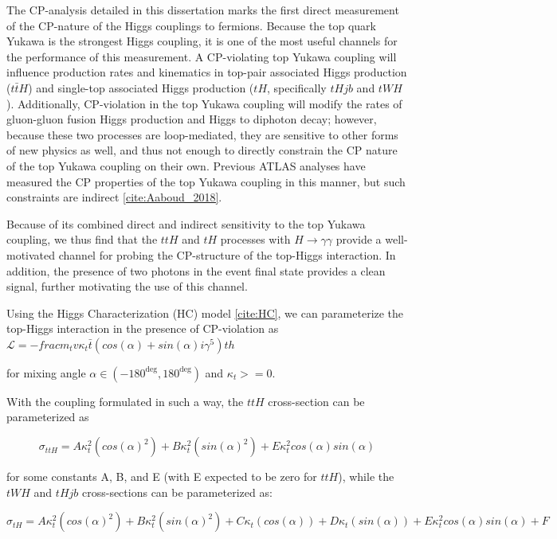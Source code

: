 The CP-analysis detailed in this dissertation marks the first direct measurement of the CP-nature of the Higgs couplings to fermions. Because the top quark Yukawa is the strongest Higgs coupling, it is one of the most useful channels for the performance of this measurement. A CP-violating top Yukawa coupling will influence production rates and kinematics in top-pair associated Higgs production ($t \bar{t} H$) and single-top associated Higgs production ($tH$, specifically $tHjb$ and $tWH$). Additionally, CP-violation in the top Yukawa coupling will modify the rates of gluon-gluon fusion Higgs production and Higgs to diphoton decay; however, because these two processes are loop-mediated, they are sensitive to other forms of new physics as well, and thus not enough to directly constrain the CP nature of the top Yukawa coupling on their own. Previous ATLAS analyses have measured the CP properties of the top Yukawa coupling in this manner, but such constraints are indirect \ref{cite:Aaboud_2018}.

Because of its combined direct and indirect sensitivity to the top Yukawa coupling, we thus find that the $ttH$ and $tH$ processes with $H \rightarrow \gamma \gamma $ provide a well-motivated channel for probing the CP-structure of the top-Higgs interaction. In addition, the presence of two photons in the event final state provides a clean signal, further motivating the use of this channel. 

Using the Higgs Characterization (HC) model \ref{cite:HC}, we can parameterize the top-Higgs interaction in the presence of CP-violation as $\mathcal{L} = -frac{m_{t}}{v} \kappa_{t} \bar{t} (cos(\alpha)+ sin(\alpha) i \gamma^{5} )th$

for mixing angle $\alpha \in (-180^{\deg}, 180^{\deg})$ and $\kappa_{t} >= 0$.

With the coupling formulated in such a way, the $ttH$ cross-section can be parameterized as

\begin{equation}
\sigma_{ttH} =  A\kappa_{t}^{2} (cos(\alpha)^{2}) + B\kappa_{t}^{2} (sin(\alpha)^{2}) + E \kappa_{t}^{2} cos(\alpha)sin(\alpha)
\end{equation}

for some constants A, B, and E (with E expected to be zero for $ttH$), while the $tWH$ and $tHjb$ cross-sections can be parameterized as:

\begin{equation}
\sigma_{tH} =  A\kappa_{t}^{2} (cos(\alpha)^{2}) + B\kappa_{t}^{2} (sin(\alpha)^{2}) + C\kappa_{t} (cos(\alpha))+ D\kappa_{t} (sin(\alpha)) + E \kappa_{t}^{2} cos(\alpha)sin(\alpha) + F
\end{equation}

